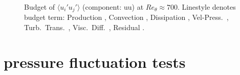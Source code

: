 \begin{figure}[H]
\centering
\begin{subfigure}[t]{0.495\textwidth}
    \subcaption{}
    \centering
    
    \label{fig:R100deg30Re1200U}
\end{subfigure}
\hfill
\begin{subfigure}[t]{0.495\textwidth}
    \centering
    \subcaption{}
    
    \label{fig:R100deg30Re1200Fluct}
\end{subfigure}
\\[-20pt]
\begin{subfigure}[t]{0.495\textwidth}
    \centering
    \subcaption{}
    
    \label{fig:R100deg30Re1200Beta}
\end{subfigure}
\hfill
\begin{subfigure}[t]{0.495\textwidth}
    \centering
    \subcaption{}
    
    \label{fig:R100deg30Re1200Budget}
\end{subfigure}
\caption{Budget of $\langle u_i' u_j' \rangle$ (component: uu) at $Re_\theta \approx 700$.
Linestyle denotes budget term:
Production ,
Convection ,
Dissipation ,
Vel-Press.\ ,
Turb.\ Trans.\ ,
Visc.\ Diff.\ ,
Residual .}
\label{fig:R100deg30Re1200}
\end{figure}


\section{pressure fluctuation tests}